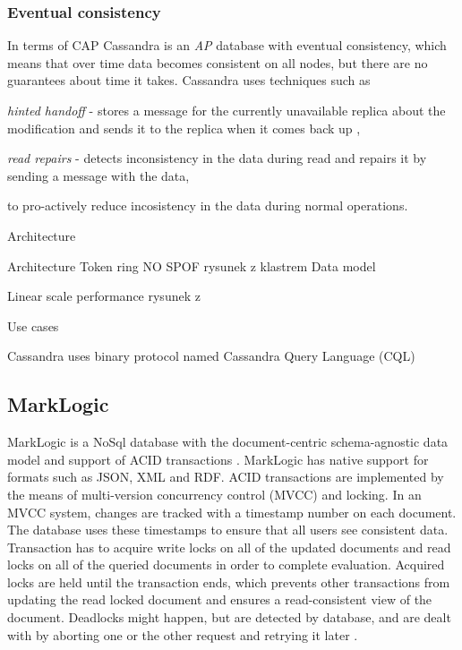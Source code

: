 \subsubsection{Eventual consistency}\label{sec:theory:eventualConsistency}
In terms of CAP \cite{brewer2000towards} \cite{Brewer:2012ba} Cassandra is an \emph{AP} database with eventual consistency, which means that over time data becomes consistent on all nodes, but there are no guarantees about time it takes. Cassandra uses techniques such as \begin{enumerate*} 
\item \emph{hinted handoff} - stores a message for the currently unavailable replica about the modification and sends it to the replica when it comes back up \cite{CassandraHintedHandoff},  
\item \emph{read repairs} - detects inconsistency in the data during read and repairs it by sending a message with the data, \cite{CassandraReadRepair} \end{enumerate*} to pro-actively reduce incosistency in the data during normal operations.


\begin{description}
\item Architecture
\end{description}
Architecture
 Token ring
 NO SPOF
 rysunek z klastrem
Data model

Linear scale performance
	rysunek z 

Use cases

 
Cassandra uses binary protocol named Cassandra Query Language (CQL)

\subsection{MarkLogic}
MarkLogic is a NoSql database with the document-centric schema-agnostic data model \cite{markLogicDataModel} and support of ACID transactions \cite{markLogicAcid}.
MarkLogic has native support for formats such as JSON, XML and RDF. ACID transactions are implemented by the means of multi-version concurrency control (MVCC) and locking. In an MVCC system, changes are tracked with a timestamp number on each document. 
The database uses these timestamps to ensure that all users see consistent data. 
Transaction has to acquire write locks on all of the updated documents and read locks on all of the queried documents in order to complete evaluation. Acquired locks are held until the transaction ends, which prevents other transactions from updating the read locked document and ensures a read-consistent view of the document. 
Deadlocks might happen, but are detected by database, and are dealt with by aborting one or the other request and retrying it later \cite{markLogicUnderstandingTransactions}.

